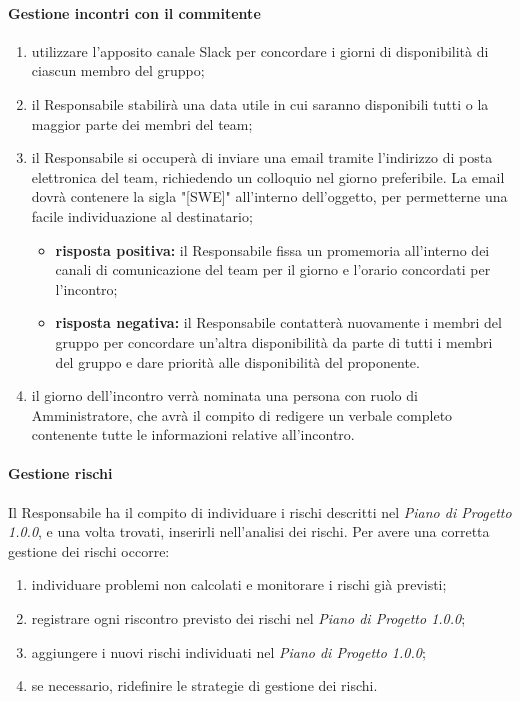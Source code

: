 	\paragraph{Gestione incontri con il commitente}
	\begin{enumerate}
		\item utilizzare l'apposito canale Slack per concordare i giorni di disponibilità di ciascun membro del gruppo;
		\item il Responsabile stabilirà una data utile in cui saranno disponibili tutti o la maggior parte dei membri del team;
		\item il Responsabile si occuperà di inviare una email tramite l'indirizzo di posta elettronica del team, richiedendo un colloquio nel giorno preferibile. La email dovrà contenere la sigla "[SWE]" all'interno dell'oggetto, per permetterne una facile individuazione al destinatario;
		\begin{itemize}
			\item \textbf{risposta positiva:} il Responsabile fissa un promemoria all'interno dei canali di comunicazione del team per il giorno e l'orario concordati per l'incontro;
			\item \textbf{risposta negativa:} il Responsabile contatterà nuovamente i membri del gruppo per concordare un'altra disponibilità da parte di tutti i membri del gruppo e dare priorità alle disponibilità del proponente.
		\end{itemize}
		\item il giorno dell'incontro verrà nominata una persona con ruolo di Amministratore, che avrà il compito di redigere un verbale completo contenente tutte le informazioni relative all'incontro.
	\end{enumerate}

	\paragraph{Gestione rischi}
	Il Responsabile ha il compito di individuare i rischi descritti nel \textit{Piano di Progetto 1.0.0\docs}, e una volta trovati, inserirli nell'analisi dei rischi. Per avere una corretta gestione dei rischi occorre:
	\begin{enumerate}
		\item individuare problemi non calcolati e monitorare i rischi già previsti;
		\item registrare ogni riscontro previsto dei rischi nel \textit{Piano di Progetto 1.0.0\docs};
		\item aggiungere i nuovi rischi individuati nel \textit{Piano di Progetto 1.0.0\docs};
		\item se necessario, ridefinire le strategie di gestione dei rischi.
	\end{enumerate}  	


